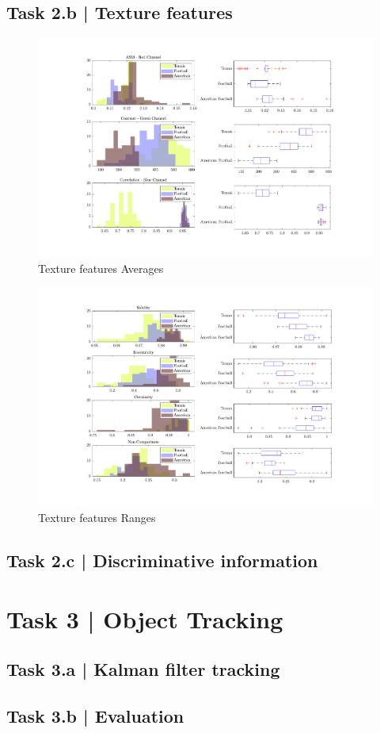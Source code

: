 \documentclass[conference]{IEEEtran}
\begin{document}
\subsection*{Task 2.b | Texture features}

\begin{figure}[htbp]
    \centering
    \includegraphics[width=\columnwidth]{figures/averages.pdf}
    \caption{Texture features Averages}
    \label{fig:tex_feats_avgs}
\end{figure}

\begin{figure}[htbp]
    \centering
    \includegraphics[width=\columnwidth]{figures/shape_feats.pdf}
    \caption{Texture features Ranges}
    \label{fig:tex_feats_ranges}
\end{figure}


\subsection*{Task 2.c | Discriminative information}

\section*{Task 3 | Object Tracking}

\subsection*{Task 3.a | Kalman filter tracking}

\subsection*{Task 3.b | Evaluation}

\appendix
\end{document}
